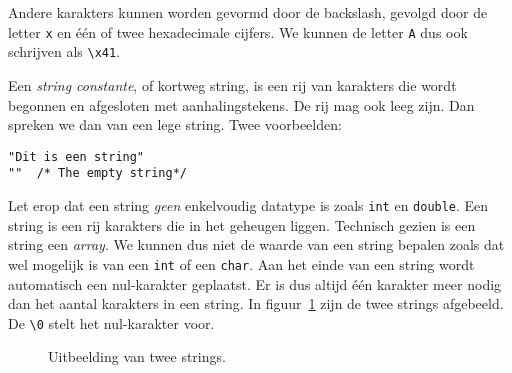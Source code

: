 
Andere karakters kunnen worden gevormd door de backslash, gevolgd door de letter \texttt{x} en één of twee hexadecimale cijfers. We kunnen de letter \texttt{A} dus ook schrijven als \texttt{\textquotesingle\textbackslash x41\textquotesingle}.

Een \textsl{string constante}, of kortweg string, is een rij van karakters die wordt begonnen en afgesloten met aanhalingstekens. De rij mag ook leeg zijn. Dan spreken we dan van een lege string. Twee voorbeelden:

\hspace*{1em}\texttt{"Dit is een string"}\\
\hspace*{1em}\lstinline[basicstyle=\ttfamily]|""|\texttt{\ \  /* The empty string*/}

Let erop dat een string \textsl{geen} enkelvoudig datatype is zoals \texttt{int} en \texttt{double}. Een string is een rij karakters die in het geheugen liggen. Technisch gezien is een string een \textsl{array}. We kunnen dus niet de waarde van een string bepalen zoals dat wel mogelijk is van een \texttt{int} of een \texttt{char}. Aan het einde van een string wordt automatisch een nul-karakter geplaatst. Er is dus altijd één karakter meer nodig dan het aantal karakters in een string. In figuur~\ref{fig:varstrings} zijn de twee strings afgebeeld. De \texttt{\textquotesingle\textbackslash0\textquotesingle} stelt het nul-karakter voor.

\begin{figure}[!ht]
\centering
{}
\caption{Uitbeelding van twee strings.}
\label{fig:varstrings}
\end{figure}

